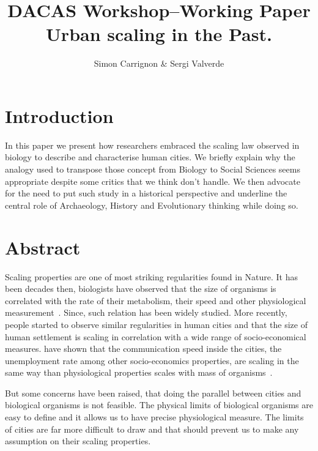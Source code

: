 \documentclass[a4paper,11pt]{article}
\title{DACAS Workshop--Working Paper\\
 Urban scaling in the Past.
}
\author{Simon Carrignon \& Sergi Valverde}
\date{}
\begin{document}
\maketitle

\section{Introduction}

In this paper we present how researchers embraced the scaling law observed in biology to describe and characterise human cities.  We briefly explain why the analogy used to transpose those concept from Biology to Social Sciences seems appropriate despite some critics that we think don't handle. We then advocate for the need to put such study in a historical perspective and underline the central role of Archaeology, History and Evolutionary thinking while doing so.


\section*{Abstract}
Scaling properties are one of most striking regularities found in Nature. It has been decades then, biologists have observed that the size of organisms is correlated with the rate of their metabolism, their speed and other  physiological measurement~\citep{bonner2011size}. Since, such relation has been widely studied. More recently, people started to observe similar regularities in human cities and that the size of human settlement is scaling in correlation with a wide range of socio-economical measures. \cite{batty2008thesizescaleandshapeofcities,bettencourt2007growthinnovationscalingandthepaceoflifeincities} have shown that the communication speed inside the cities, the unemployment rate among other socio-economics properties, are scaling in the same way than physiological properties scales with mass of organisms~. 

But some concerns have been raised, that doing the parallel between cities and biological organisms is not feasible. The physical limits of biological organisms are easy to define and it allows us to have precise physiological measure. The limits of cities are far more difficult to draw and that should prevent us to make any assumption on their scaling properties. 
\end{document}
